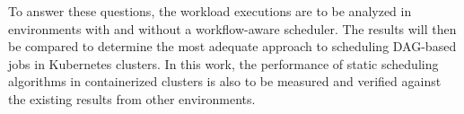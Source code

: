 To answer these questions, the workload executions are to be analyzed in environments with and without a workflow-aware scheduler.
The results will then be compared to determine the most adequate approach to scheduling DAG-based jobs in Kubernetes clusters. %
In this work, the performance of static scheduling algorithms in containerized clusters is also to be measured and verified against the existing results from other environments.


























